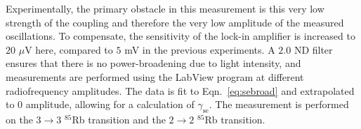 Experimentally, the primary obstacle in this measurement is this very low strength of the coupling and therefore the very low amplitude of the measured oscillations. To compensate, the sensitivity of the lock-in amplifier is increased to $20$  $\mu$V here, compared to $5$ mV in the previous experiments. A $2.0$ ND filter ensures that there is no power-broadening due to light intensity, and measurements are performed using the LabView program at different radiofrequency amplitudes. The data is fit to Eqn.~\ref{eq:sebroad} and extrapolated to 0 amplitude, allowing for a calculation of $\gamma_{\mathrm{se}}$. The measurement is performed on the $3\rightarrow3$  $^{85}$Rb transition and the $2\rightarrow2$ $^{85}$Rb transition. 











